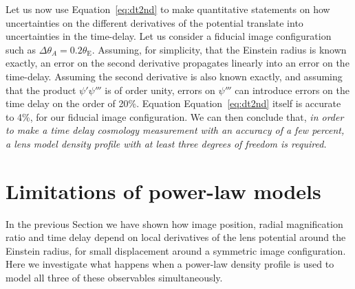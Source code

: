 \documentclass[usenatbib]{mnras}
\def\psii{\psi'}
\def\psiiii{\psi'''}
\def\tein{\theta_{\mathrm{E}}}
\def\Eref#1{Equation~\ref{#1}\xspace}
\begin{document}
Let us now use \Eref{eq:dt2nd} to make quantitative statements on how uncertainties on the different derivatives of the potential translate into uncertainties in the time-delay.
Let us consider a fiducial image configuration such as $\Delta\theta_A = 0.2\tein$.
Assuming, for simplicity, that the Einstein radius is known exactly, an error on the second derivative propagates linearly into an error on the time-delay. Assuming the second derivative is also known exactly, and assuming that the product $\psii\psiiii$ is of order unity, errors on $\psiiii$ can introduce errors on the time delay on the order of 20\%.
Equation \Eref{eq:dt2nd} itself is accurate to 4\%, for our fiducial image configuration.
We can then conclude that, {\em in order to make a time delay cosmology measurement with an accuracy of a few percent, a lens model density profile with at least three degrees of freedom is required.}

\section{Limitations of power-law models}\label{sect:pl}

In the previous Section we have shown how image position, radial magnification ratio and time delay depend on local derivatives of the lens potential around the Einstein radius, for small displacement around a symmetric image configuration.
Here we investigate what happens when a power-law density profile is used to model all three of these observables simultaneously.
\end{document}

